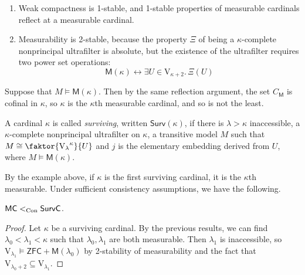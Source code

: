 \begin{remark}
    \begin{enumerate}
        \item Weak compactness is 1-stable, and 1-stable properties of measurable cardinals reflect at a measurable cardinal.
        \item Measurability is 2-stable, because the property \( \Xi \) of being a \( \kappa \)-complete nonprincipal ultrafilter is absolute, but the existence of the ultrafilter requires two power set operations:
        \[ \mathsf{M}(\kappa) \leftrightarrow \exists U \in \mathrm{V}_{\kappa + 2}.\, \Xi(U) \]
    \end{enumerate}
\end{remark}
\begin{example}
    Suppose that \( M \vDash \mathsf{M}(\kappa) \).
    Then by the same reflection argument, the set \( C_{\mathsf{M}} \) is cofinal in \( \kappa \), so \( \kappa \) is the \( \kappa \)th measurable cardinal, and so is not the least.
\end{example}
\begin{definition}
    A cardinal \( \kappa \) is called \emph{surviving}, written \( \mathsf{Surv}(\kappa) \), if there is \( \lambda > \kappa \) inaccessible, a \( \kappa \)-complete nonprincipal ultrafilter on \( \kappa \), a transitive model \( M \) such that \( M \cong \faktor{{\mathrm{V}_\lambda}^\kappa}{U} \) and \( j \) is the elementary embedding derived from \( U \), where \( M \vDash \mathsf{M}(\kappa) \).
\end{definition}
By the example above, if \( \kappa \) is the first surviving cardinal, it is the \( \kappa \)th measurable.
Under sufficient consistency assumptions, we have the following.
\begin{corollary}
    \( \mathsf{MC} <_{\operatorname{Con}} \mathsf{SurvC} \).
\end{corollary}
\begin{proof}
    Let \( \kappa \) be a surviving cardinal.
    By the previous results, we can find \( \lambda_0 < \lambda_1 < \kappa \) such that \( \lambda_0, \lambda_1 \) are both measurable.
    Then \( \lambda_1 \) is inaccessible, so \( \mathrm{V}_{\lambda_1} \vDash \mathsf{ZFC} + \mathsf{M}(\lambda_0) \) by 2-stability of measurability and the fact that \( \mathrm{V}_{\lambda_0 + 2} \subseteq \mathrm{V}_{\lambda_1} \).
\end{proof}

